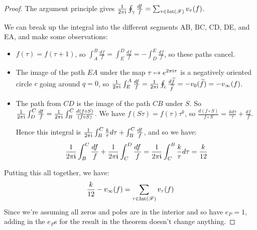 \documentclass[10pt,a4paper]{article}
\begin{document}
\begin{proof}
  The argument principle gives $\frac{1}{2\pi\mathfrak{i}}\oint_\gamma \frac{df}{f} = \sum_{\tau \in \operatorname{Int}(\mathscr{F})} v_\tau(f)$.

  We can break up the integral into the different segments AB, BC, CD, DE, and EA, and make some observations:
  \begin{itemize}
    \item $f(\tau) = f(\tau+1)$, so $\int_A^B \frac{df}{f} = \int_E^D \frac{df}{f} = -\int_D^E \frac{df}{f}$, so these paths cancel.
    \item The image of the path $EA$ under the map $\tau \mapsto e^{2\pi\mathfrak{i}\tau}$ is a negatively oriented circle $c$ going around $q= 0$, so $\frac{1}{2\pi\mathfrak{i}}\int_E^A \frac{df}{f} = \frac{1}{2\pi\mathfrak{i}}\oint_c \frac{d\widetilde{f}}{\widetilde{f}} = -v_0(\widetilde{f}) = -v_\infty(f)$.
    \item The path from $CD$ is the image of the path $CB$ under $S$. So $\frac{1}{2\pi\mathfrak{i}}\int_D^C \frac{df}{f} = \frac{1}{2\pi\mathfrak{i}}\int_B^C \frac{d(f\circ S)}{(f\circ S)}$. We have $f(S\tau) = f(\tau)\tau^k$, so $\frac{d(f\circ S)}{f\circ S} = \frac{kd\tau}{\tau} + \frac{df}{f}$.

    Hence this integral is $\frac{1}{2\pi\mathfrak{i}}\int_B^C \frac{k}{\tau}d\tau + \int_B^C \frac{df}{f}$, and so we have:
    \[\frac{1}{2\pi\mathfrak{i}}\int_B^C \frac{df}{f} + \frac{1}{2\pi\mathfrak{i}}\int_C^D \frac{df}{f} = \frac{1}{2\pi\mathfrak{i}}\int_C^B\frac{k}{\tau}d\tau = \frac{k}{12}\]
  \end{itemize}
  Putting this all together, we have:
  \[\frac{k}{12} - v_\infty(f) = \sum_{\tau \in \operatorname{Int}(\mathscr{F})} v_\tau(f)\]
  Since we're assuming all zeros and poles are in the interior and so have $e_P = 1$, adding in the $e_P$s for the result in the theorem doesn't change anything.


\end{proof}
\end{document}
